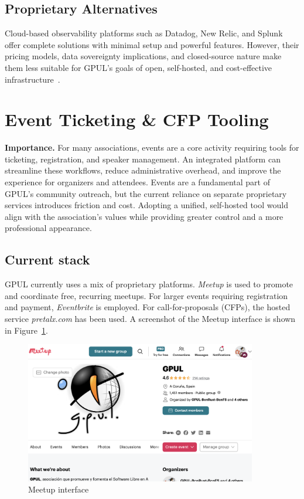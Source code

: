 \subsection*{Proprietary Alternatives}
Cloud-based observability platforms such as Datadog, New Relic, and Splunk offer complete solutions with minimal setup and powerful features. However, their pricing models, data sovereignty implications, and closed-source nature make them less suitable for GPUL's goals of open, self-hosted, and cost-effective infrastructure~\cite{datadog_web}.

\section{Event Ticketing \& CFP Tooling}

\textbf{Importance.} For many associations, events are a core activity requiring tools for ticketing, registration, and speaker management. An integrated platform can streamline these workflows, reduce administrative overhead, and improve the experience for organizers and attendees. Events are a fundamental part of GPUL's community outreach, but the current reliance on separate proprietary services introduces friction and cost. Adopting a unified, self-hosted tool would align with the association's values while providing greater control and a more professional appearance.

\subsection*{Current stack}
GPUL currently uses a mix of proprietary platforms. \emph{Meetup} is used to promote and coordinate free, recurring meetups. For larger events requiring registration and payment, \emph{Eventbrite} is employed. For call-for-proposals (CFPs), the hosted service \emph{pretalx.com} has been used. A screenshot of the Meetup interface is shown in Figure~\ref{fig:meetup-ui}.

\begin{figure}[H]
  \centering
  \includegraphics[width=0.9\textwidth]{imaxes/meetup-ui.png}
  \caption{Meetup interface}
  \label{fig:meetup-ui}
\end{figure}

